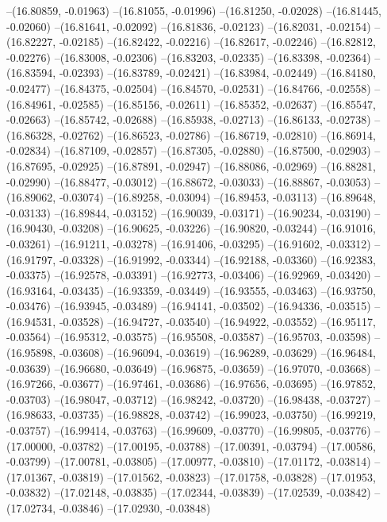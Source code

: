 --(16.80859, -0.01963)
--(16.81055, -0.01996)
--(16.81250, -0.02028)
--(16.81445, -0.02060)
--(16.81641, -0.02092)
--(16.81836, -0.02123)
--(16.82031, -0.02154)
--(16.82227, -0.02185)
--(16.82422, -0.02216)
--(16.82617, -0.02246)
--(16.82812, -0.02276)
--(16.83008, -0.02306)
--(16.83203, -0.02335)
--(16.83398, -0.02364)
--(16.83594, -0.02393)
--(16.83789, -0.02421)
--(16.83984, -0.02449)
--(16.84180, -0.02477)
--(16.84375, -0.02504)
--(16.84570, -0.02531)
--(16.84766, -0.02558)
--(16.84961, -0.02585)
--(16.85156, -0.02611)
--(16.85352, -0.02637)
--(16.85547, -0.02663)
--(16.85742, -0.02688)
--(16.85938, -0.02713)
--(16.86133, -0.02738)
--(16.86328, -0.02762)
--(16.86523, -0.02786)
--(16.86719, -0.02810)
--(16.86914, -0.02834)
--(16.87109, -0.02857)
--(16.87305, -0.02880)
--(16.87500, -0.02903)
--(16.87695, -0.02925)
--(16.87891, -0.02947)
--(16.88086, -0.02969)
--(16.88281, -0.02990)
--(16.88477, -0.03012)
--(16.88672, -0.03033)
--(16.88867, -0.03053)
--(16.89062, -0.03074)
--(16.89258, -0.03094)
--(16.89453, -0.03113)
--(16.89648, -0.03133)
--(16.89844, -0.03152)
--(16.90039, -0.03171)
--(16.90234, -0.03190)
--(16.90430, -0.03208)
--(16.90625, -0.03226)
--(16.90820, -0.03244)
--(16.91016, -0.03261)
--(16.91211, -0.03278)
--(16.91406, -0.03295)
--(16.91602, -0.03312)
--(16.91797, -0.03328)
--(16.91992, -0.03344)
--(16.92188, -0.03360)
--(16.92383, -0.03375)
--(16.92578, -0.03391)
--(16.92773, -0.03406)
--(16.92969, -0.03420)
--(16.93164, -0.03435)
--(16.93359, -0.03449)
--(16.93555, -0.03463)
--(16.93750, -0.03476)
--(16.93945, -0.03489)
--(16.94141, -0.03502)
--(16.94336, -0.03515)
--(16.94531, -0.03528)
--(16.94727, -0.03540)
--(16.94922, -0.03552)
--(16.95117, -0.03564)
--(16.95312, -0.03575)
--(16.95508, -0.03587)
--(16.95703, -0.03598)
--(16.95898, -0.03608)
--(16.96094, -0.03619)
--(16.96289, -0.03629)
--(16.96484, -0.03639)
--(16.96680, -0.03649)
--(16.96875, -0.03659)
--(16.97070, -0.03668)
--(16.97266, -0.03677)
--(16.97461, -0.03686)
--(16.97656, -0.03695)
--(16.97852, -0.03703)
--(16.98047, -0.03712)
--(16.98242, -0.03720)
--(16.98438, -0.03727)
--(16.98633, -0.03735)
--(16.98828, -0.03742)
--(16.99023, -0.03750)
--(16.99219, -0.03757)
--(16.99414, -0.03763)
--(16.99609, -0.03770)
--(16.99805, -0.03776)
--(17.00000, -0.03782)
--(17.00195, -0.03788)
--(17.00391, -0.03794)
--(17.00586, -0.03799)
--(17.00781, -0.03805)
--(17.00977, -0.03810)
--(17.01172, -0.03814)
--(17.01367, -0.03819)
--(17.01562, -0.03823)
--(17.01758, -0.03828)
--(17.01953, -0.03832)
--(17.02148, -0.03835)
--(17.02344, -0.03839)
--(17.02539, -0.03842)
--(17.02734, -0.03846)
--(17.02930, -0.03848)
